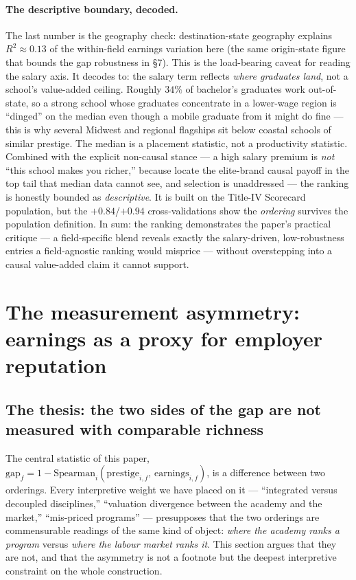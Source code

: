 \documentclass[11pt]{article}
\begin{document}
\paragraph{The descriptive boundary, decoded.} The last number is the geography check: destination-state geography explains \textbf{$R^2\approx0.13$} of the within-field earnings variation here (the same origin-state figure that bounds the gap robustness in \S7). This is the load-bearing caveat for reading the salary axis. It decodes to: the salary term reflects \emph{where graduates land}, not a school's value-added ceiling. Roughly $34\%$ of bachelor's graduates work out-of-state, so a strong school whose graduates concentrate in a lower-wage region is ``dinged'' on the median even though a mobile graduate from it might do fine --- this is why several Midwest and regional flagships sit below coastal schools of similar prestige. The median is a placement statistic, not a productivity statistic. Combined with the explicit non-causal stance --- a high salary premium is \emph{not} ``this school makes you richer,'' because \citet{chetty2023diversifying} locate the elite-brand causal payoff in the top tail that median data cannot see, and selection is unaddressed --- the ranking is honestly bounded as \emph{descriptive}. It is built on the Title-IV Scorecard population, but the $+0.84$/$+0.94$ cross-validations show the \emph{ordering} survives the population definition. In sum: the ranking demonstrates the paper's practical critique --- a field-specific blend reveals exactly the salary-driven, low-robustness entries a field-agnostic ranking would misprice --- without overstepping into a causal value-added claim it cannot support.\section{The measurement asymmetry: earnings as a proxy for employer reputation}\label{sec:asymmetry}

\subsection{The thesis: the two sides of the gap are not measured with comparable richness}

The central statistic of this paper, $\mathrm{gap}_f = 1 - \mathrm{Spearman}_i(\mathrm{prestige}_{i,f},\,\mathrm{earnings}_{i,f})$, is a difference between two orderings. Every interpretive weight we have placed on it --- ``integrated versus decoupled disciplines,'' ``valuation divergence between the academy and the market,'' ``mis-priced programs'' --- presupposes that the two orderings are commensurable readings of the same kind of object: \emph{where the academy ranks a program} versus \emph{where the labour market ranks it}. This section argues that they are not, and that the asymmetry is not a footnote but the deepest interpretive constraint on the whole construction.
\end{document}
